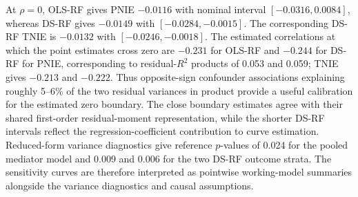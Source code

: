 At $\rho=0$, OLS-RF gives PNIE $-0.0116$ with nominal interval $[-0.0316,0.0084]$, whereas DS-RF gives $-0.0149$ with $[-0.0284,-0.0015]$. The corresponding DS-RF TNIE is $-0.0132$ with $[-0.0246,-0.0018]$. The estimated correlations at which the point estimates cross zero are $-0.231$ for OLS-RF and $-0.244$ for DS-RF for PNIE, corresponding to residual-$R^2$ products of 0.053 and 0.059; TNIE gives $-0.213$ and $-0.222$. Thus opposite-sign confounder associations explaining roughly 5--6\% of the two residual variances in product provide a useful calibration for the estimated zero boundary. The close boundary estimates agree with their shared first-order residual-moment representation, while the shorter DS-RF intervals reflect the regression-coefficient contribution to curve estimation. Reduced-form variance diagnostics give reference $p$-values of 0.024 for the pooled mediator model and 0.009 and 0.006 for the two DS-RF outcome strata. The sensitivity curves are therefore interpreted as pointwise working-model summaries alongside the variance diagnostics and causal assumptions.
